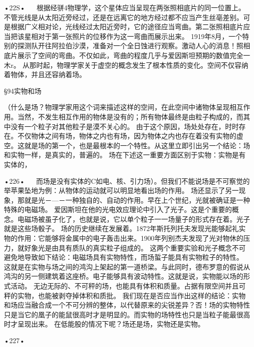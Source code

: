 •22S•
  
根据经骈4物理学，这个星体应当呈现在两张照相底片的同一位置上。不管光线是从太阳近旁经过，还是在远离它的地方经过都不应当产生丝亳差别。可是根据广义相对论，光线经过太阳近旁时，它的途径应当弯曲。第二张照相底片应当把该星相对于第一张照片的位移作为这一弯曲而展示出来。
1919年8月，一个特别的探测队开往阿拉伯沙漠，准备对一个全日蚀进行观察。激动人心的消息！照相底片展示了空间的弯曲。不仅如此，弯曲的程度几乎与爱因斯坦预期的数值完全一木r。
从那时起，物理学家关于虚空的概念发生了根本性质的变化。空间不仅容纳着物体，并且还容纳着场。

§94实物和场

（什么是场？物理学家用这个词来描述这样的空间，在此空间中诸物体呈现相互作用。当然，不发生相互作用的物体是没有的；所有物体最终是由粒子构成的，而其中没有一个粒子对其他粒子是漠不关心的。
由于这个原因，场处处存在，时时存在。不仅物体之间有场，物体之内也有场，因为物体之内也存在着没有实物的虚空。这就是场的第一个，也是最根本的一个特性。从这里立即引出另一个结论：场和实物一样，是真实的，普遍的。
场在下述这一重要方面区别于实物：实物是有实体的，

•226•
  
而场是没有实体的C如电、核、引力场）。但我们不能说场是不可察觉的举苹果坠地为例：从物体的运动就可以明显地看出场的作用。
场还显示了另一现象，那就是光－—－一种独自的、自动的作用。早在上个世纪，光就被确证是一种特殊的电磁场。
爱因斯坦在他的光电效应理论中引入了光子。这是个重要的概念。电磁场被虽子化了，也就是说，它以单个粒子一一场量子的形式存在着。光子就是这些场骰子。
场的历史继续在发展着。1872年斯托列托夫发现光能够起礼实物的作用：它能够将金属中的电子轰击出来。1900年列别杰夫发现了光对物休的压力，就好象光是由具有质队的真实粒子组成的。
这两个重要实验和光子概念不可避免地导致如下结论：电磁场具有实物特性，而场蜇子能具有实物粒子的特性。
这就是在实物与场之间的鸿沟上架起的第一道桥梁。与此同时，德布罗意的假说从鸿沟的另一侧建筑着这座桥。电子能够具有波动特性。这就是说，实物能以场的形式活动。
无边无际的、不可秤的场，也能具有体积和质量。占据有限空间并且可秤的实物，也能被剥夺掉体积和质批。
我们现在是否应当作出这样的结论：实物和场应当融合成一个不可分辨的整体，以代替原来的尖锐差异？否！场的实物特性只是当它的凰子的能鼠很高时才是明显的。而实物的场特性也只是当粒子能最很高时才呈现出来。
在低能股的情况下呢？场还是场，实物还是实物。

•227•
  





